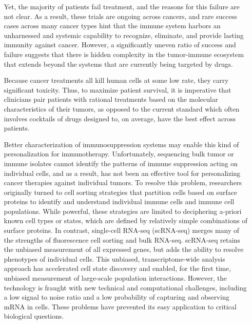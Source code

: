 Yet, the majority of patients fail treatment, and the reasons for this failure are not clear.  
As a result, these trials are ongoing across cancers, and rare success cases across many cancer types hint that the immune system harbors an unharnessed and systemic capability to recognize, eliminate, and provide lasting immunity against cancer.
However, a significantly uneven ratio of success and failure suggests that there is hidden complexity in the tumor-immune ecosystem that extends beyond the systems that are currently being targeted by drugs.

Because cancer treatments all kill human cells at some low rate, they carry significant toxicity. 
Thus, to maximize patient survival, it is imperative that clinicians pair patients with rational treatments based on the molecular characteristics of their tumors, as opposed to the current standard which often involves cocktails of drugs designed to, on average, have the best effect across patients. 

Better characterization of immunosuppression systems may enable this kind of personalization for immunotherapy. 
Unfortunately, sequencing bulk tumor or immune isolates cannot identify the patterns of immune suppression acting on individual cells, and as a result, has not been an effective tool for personalizing cancer therapies against individual tumors.  
To resolve this problem, researchers originally turned to cell sorting strategies that partition cells based on surface proteins to identify and understand individual immune cells and immune cell populations.
While powerful, these strategies are limited to deciphering a-priori known cell types or states, which are defined by relatively simple combinations of surface proteins.
In contrast, single-cell RNA-seq (scRNA-seq) merges many of the strengths of fluorescence cell sorting and bulk RNA-seq. 
scRNA-seq retains the unbiased measurement of all expressed genes, but adds the ability to resolve phenotypes of individual cells.
This unbiased, transcriptome-wide analysis approach has accelerated cell state discovery and enabled, for the first time, unbiased measurement of large-scale population interactions.
However, the technology is fraught with new technical and computational challenges, including a low signal to noise ratio and a low probability of capturing and observing mRNA in cells. 
These problems have prevented its easy application to critical biological questions.

